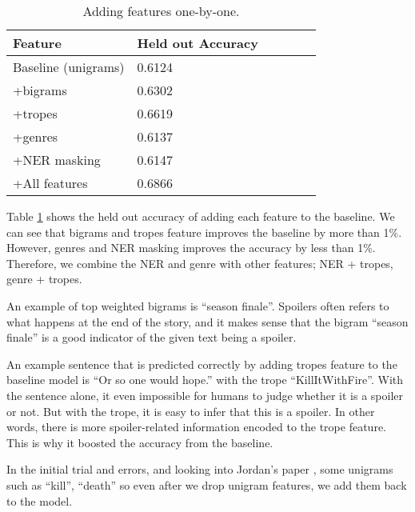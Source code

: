 \documentclass[11pt]{article}
\begin{document}
\begin{table}[h]
  \centering
  \begin{tabular}{|l|l|r|r|r|r|}
  \hline \bf Feature        & \bf Held out Accuracy     \\ \hline
   Baseline (unigrams)      & 0.6124 \\ \hline
   +bigrams                 & 0.6302 \\ \hline
   +tropes                  & 0.6619 \\ \hline
   +genres                  & 0.6137 \\ \hline
   +NER masking             & 0.6147 \\ \hline
   +All features            & 0.6866 \\ \hline
  \end{tabular}
  \caption{\label{feature} Adding features one-by-one.}
\end{table}

Table \ref{feature} shows the held out accuracy of adding each feature to the baseline. We can see that bigrams and tropes feature improves the baseline by more than 1\%. However, genres and NER masking improves the accuracy by less than 1\%. Therefore, we combine the NER and genre with other features; NER + tropes, genre + tropes. 

An example of top weighted bigrams is ``season finale''. Spoilers often refers to what happens at the end of the story, and it makes sense that the bigram ``season finale'' is a good indicator of the given text being a spoiler.

An example sentence that is predicted correctly by adding tropes feature to the baseline model is ``Or so one would hope.'' with the trope ``KillItWithFire''. With the sentence alone, it even impossible for humans to judge whether it is a spoiler or not. But with the trope, it is easy to infer that this is a spoiler. In other words, there is more spoiler-related information encoded to the trope feature. This is why it boosted the accuracy from the baseline. 

In the initial trial and errors, and looking into Jordan's paper \cite{Boyd-Graber:Glasgow:Zajac-2013}, some unigrams such as ``kill'', ``death'' so even after we drop unigram features, we add them back to the model.
\end{document}
